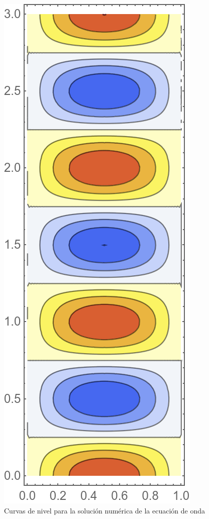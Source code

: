 \documentclass[a4paper]{article}
\begin{document}
\begin{figure}[H]
\begin{center}
\includegraphics[scale=0.22]{./wave_contour.png} 
\end{center} 
\caption{Curvas de nivel para la solución numérica de la ecuación de onda}
\label{fig::fig8}
\end{figure}
\end{document}

